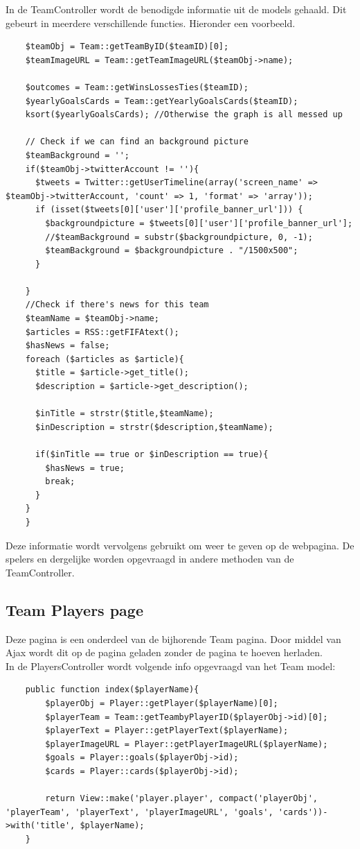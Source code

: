 \documentclass[11pt, a4paper]{article}
\begin{document}
In de TeamController wordt de benodigde informatie uit de models gehaald. Dit gebeurt in meerdere verschillende functies. Hieronder een voorbeeld.
\begin{lstlisting}
    $teamObj = Team::getTeamByID($teamID)[0];
    $teamImageURL = Team::getTeamImageURL($teamObj->name);

    $outcomes = Team::getWinsLossesTies($teamID);
    $yearlyGoalsCards = Team::getYearlyGoalsCards($teamID);
    ksort($yearlyGoalsCards); //Otherwise the graph is all messed up

    // Check if we can find an background picture
    $teamBackground = '';
    if($teamObj->twitterAccount != ''){
      $tweets = Twitter::getUserTimeline(array('screen_name' => $teamObj->twitterAccount, 'count' => 1, 'format' => 'array'));
      if (isset($tweets[0]['user']['profile_banner_url'])) {
        $backgroundpicture = $tweets[0]['user']['profile_banner_url'];
        //$teamBackground = substr($backgroundpicture, 0, -1);
        $teamBackground = $backgroundpicture . "/1500x500";
      }

    }
    //Check if there's news for this team
    $teamName = $teamObj->name;
    $articles = RSS::getFIFAtext();
    $hasNews = false;
    foreach ($articles as $article){
      $title = $article->get_title();
      $description = $article->get_description();

      $inTitle = strstr($title,$teamName);
      $inDescription = strstr($description,$teamName);

      if($inTitle == true or $inDescription == true){
        $hasNews = true;
        break;
      }
    }
	}
\end{lstlisting}

Deze informatie wordt vervolgens gebruikt om weer te geven op de webpagina. De spelers en dergelijke worden opgevraagd in andere methoden van de TeamController.

\subsection{Team Players page}
Deze pagina is een onderdeel van de bijhorende Team pagina. Door middel van Ajax wordt dit op de pagina geladen zonder de pagina te hoeven herladen.
\\
In de PlayersController wordt volgende info opgevraagd van het Team model:
\begin{lstlisting}
	public function index($playerName){
		$playerObj = Player::getPlayer($playerName)[0];
		$playerTeam = Team::getTeambyPlayerID($playerObj->id)[0];
		$playerText = Player::getPlayerText($playerName);
		$playerImageURL = Player::getPlayerImageURL($playerName);
		$goals = Player::goals($playerObj->id);
		$cards = Player::cards($playerObj->id);

		return View::make('player.player', compact('playerObj', 'playerTeam', 'playerText', 'playerImageURL', 'goals', 'cards'))->with('title', $playerName);
	}
\end{lstlisting}
\end{document}
